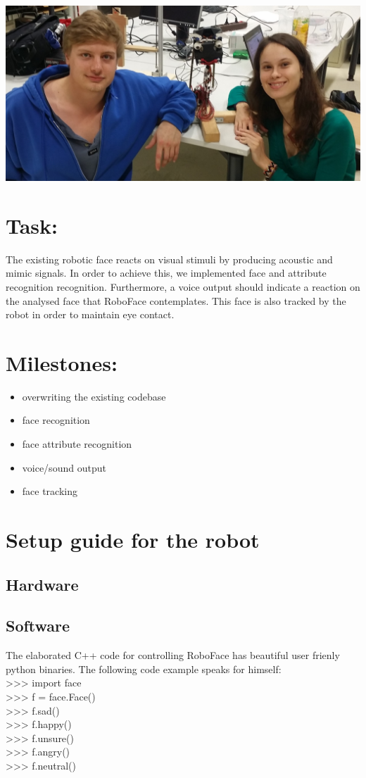 \documentclass[12.5pt]{scrartcl}
\begin{document}
	\vspace*{8mm}
	\begin{center}
		\includegraphics[width=0.88\linewidth]{images/faceEdited}
	\end{center}
	
	\section{Task:}
	The existing robotic face reacts on visual stimuli by producing acoustic and mimic signals. In order to achieve this, we implemented face and attribute recognition recognition. Furthermore, a voice output should indicate a reaction on the analysed face that RoboFace contemplates. This face is also tracked by the robot in order to maintain eye contact. 
	
	\section{Milestones:}
	\begin{itemize}
		\item overwriting the existing codebase
		\item face recognition
		\item face attribute recognition
		\item voice/sound output
		\item face tracking
	\end{itemize}

	\section{Setup guide for the robot}
	\subsection{Hardware}
	\subsection{Software}
	The elaborated C++ code for controlling RoboFace has beautiful user frienly python binaries. The following code example speaks for himself: \\
	>>> import face \\
	>>> f = face.Face()\\
	>>> f.sad()\\
	>>> f.happy()\\
	>>> f.unsure()\\
	>>> f.angry()\\
	>>> f.neutral()\\
\end{document}
